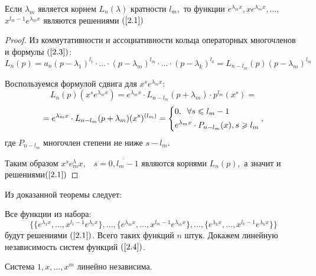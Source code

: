 \begin{theorem}
Если $\lambda_m$ является корнем $L_n(\lambda)$ кратности $l_m,$ то функции $e^{\lambda_m x}, xe^{\lambda_m x}, \dots$, $x^{l_m-1}e^{\lambda_m x}$ являются решениями $(\ref{2.1})$
\end{theorem}
\begin{proof}
Из коммутативности и ассоциативности кольца операторных многочленов и формулы $(\ref{2.3})$: $L_n(p)=a_n(p-\lambda_1)^{l_1}\cdot ... \cdot (p-\lambda_m)^{l_m}\cdot ... \cdot (p-\lambda_k)^{l_k}=L_{n-l_m}(p)(p-\lambda_m)^{l_m}$\par
Воспользуемся формулой сдвига для $x^se^{\lambda_m x}:$
$$L_n(p)(x^se^{\lambda_m x})=e^{\lambda_m x}\cdot L_{n-l_m}(p+\lambda_m) \cdot p^{l_m}(x^s)=$$
$$=e^{\lambda_m x}\cdot L_{n-l_m}(p+\lambda_m)(x^s)^{(l_m)}=\left\{\begin{gathered}
    0, \;\;\forall s\leqslant l_m-1\hfill
    \\
    e^{\lambda_m x}\cdot P_{n-l_m}(x), s\geqslant l_m \hfill
    \\
\end{gathered}
\right.,$$
где $P_{n-l_m}$ многочлен степени не ниже $s-l_m$.\par
Таким образом $x^se^\lambda_m x, \;\;\;s=\overline{0, l_{m}-1}$ являются корнями $L_n(p),$ а значит и решениями$(\ref{2.1})$
\end{proof}
Из доказанной теоремы следует:
\par
Все функции из набора:
\begin{equation}
\tag{2.4}
\label{2.4}
    \Bigg\{\{e^{\lambda_1 x}, \dots, x^{l_1-1}e^{\lambda_1 x}\}, \dots, \{e^{\lambda_mx}, \dots, x^{l_m-1 }e^{\lambda_mx}\}, \dots, \{e^{\lambda_k x}, \dots, x^{l_k-1}e^{\lambda_k x}\}\Bigg\}
\end{equation}
будут решениями $(\ref{2.1})$. Всего таких функций $n$ штук. Докажем линейную независимость систем функций $(\ref{2.4})$.
\begin{lemma}\label{lem1}
Система $1, x, \dots, x^m$ линейно независима. 
\end{lemma}

